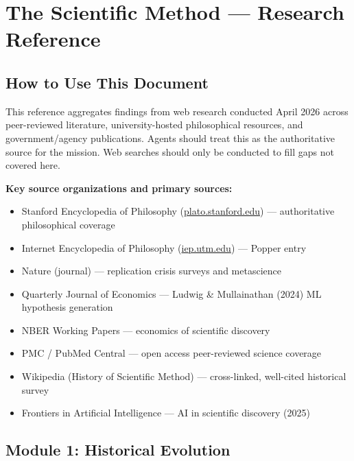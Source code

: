 \documentclass[11pt,letterpaper]{article}
\newcommand{\stageheader}[2]{%
  \noindent\colorbox{#2}{\makebox[\textwidth][l]{%
    \textcolor{white}{\bfseries\sffamily\hspace{6pt}#1\hspace{6pt}}}}%
  \vspace{0.5em}\par%
}
\begin{document}
\newpage

\stageheader{STAGE 2 --- RESEARCH REFERENCE}{secondary}

\section{The Scientific Method --- Research Reference}

\subsection{How to Use This Document}

This reference aggregates findings from web research conducted April 2026 across peer-reviewed literature, university-hosted philosophical resources, and government/agency publications. Agents should treat this as the authoritative source for the mission. Web searches should only be conducted to fill gaps not covered here.

\textbf{Key source organizations and primary sources:}
\begin{itemize}[leftmargin=1.5em]
  \item Stanford Encyclopedia of Philosophy (\url{plato.stanford.edu}) --- authoritative philosophical coverage
  \item Internet Encyclopedia of Philosophy (\url{iep.utm.edu}) --- Popper entry
  \item Nature (journal) --- replication crisis surveys and metascience
  \item Quarterly Journal of Economics --- Ludwig \& Mullainathan (2024) ML hypothesis generation
  \item NBER Working Papers --- economics of scientific discovery
  \item PMC / PubMed Central --- open access peer-reviewed science coverage
  \item Wikipedia (History of Scientific Method) --- cross-linked, well-cited historical survey
  \item Frontiers in Artificial Intelligence --- AI in scientific discovery (2025)
\end{itemize}

\subsection{Module 1: Historical Evolution}
\end{document}
